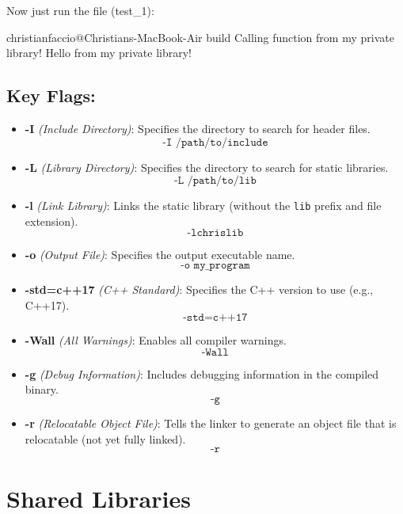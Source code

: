 Now just run the file (test\_1):
\begin{codeblock}[language=bash]
    christianfaccio@Christians-MacBook-Air build %
    Calling function from my private library!
    Hello from my private library!
\end{codeblock}


\subsection*{Key Flags:}
\begin{itemize}
    \item \textbf{-I} \textit{(Include Directory)}: Specifies the directory to search for header files. 
    \[
    \texttt{-I /path/to/include}
    \]
    
    \item \textbf{-L} \textit{(Library Directory)}: Specifies the directory to search for static libraries.
    \[
    \texttt{-L /path/to/lib}
    \]

    \item \textbf{-l} \textit{(Link Library)}: Links the static library (without the \texttt{lib} prefix and file extension).
    \[
    \texttt{-lchrislib}
    \]

    \item \textbf{-o} \textit{(Output File)}: Specifies the output executable name.
    \[
    \texttt{-o my\_program}
    \]

    \item \textbf{-std=c++17} \textit{(C++ Standard)}: Specifies the C++ version to use (e.g., C++17).
    \[
    \texttt{-std=c++17}
    \]

    \item \textbf{-Wall} \textit{(All Warnings)}: Enables all compiler warnings.
    \[
    \texttt{-Wall}
    \]

    \item \textbf{-g} \textit{(Debug Information)}: Includes debugging information in the compiled binary.
    \[
    \texttt{-g}
    \]

    \item \textbf{-r} \textit{(Relocatable Object File)}: Tells the linker to generate an object file that is relocatable (not yet fully linked). 
    \[
    \texttt{-r}
    \]
\end{itemize}



\section{Shared Libraries}


